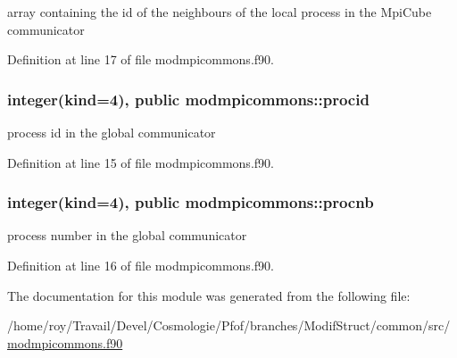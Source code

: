 array containing the id of the neighbours of the local process in the Mpi\-Cube communicator 



Definition at line 17 of file modmpicommons.\-f90.

\hypertarget{classmodmpicommons_a895d05e6095a8a0c14013d3af546148f}{
\subsubsection[{procid}]{\setlength{\rightskip}{0pt plus 5cm}integer(kind=4), public modmpicommons\-::procid}}\label{classmodmpicommons_a895d05e6095a8a0c14013d3af546148f}


process id in the global communicator 



Definition at line 15 of file modmpicommons.\-f90.

\hypertarget{classmodmpicommons_ae6d2f748e667900423c3bd8404bf165d}{
\subsubsection[{procnb}]{\setlength{\rightskip}{0pt plus 5cm}integer(kind=4), public modmpicommons\-::procnb}}\label{classmodmpicommons_ae6d2f748e667900423c3bd8404bf165d}


process number in the global communicator 



Definition at line 16 of file modmpicommons.\-f90.



The documentation for this module was generated from the following file\-:\begin{DoxyCompactItemize}
\item 
/home/roy/\-Travail/\-Devel/\-Cosmologie/\-Pfof/branches/\-Modif\-Struct/common/src/\hyperlink{modmpicommons_8f90}{modmpicommons.\-f90}\end{DoxyCompactItemize}
